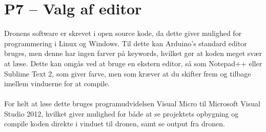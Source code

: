 \documentclass[Main]{subfiles}
\begin{document}
\section[Valg af editor]{P7 -- Valg af editor}\label{sec:software}
Dronens software er skrevet i open source kode, da dette giver mulighed for programmering i Linux og Windows\cite{AQ-software}.
Til dette kan Arduino's standard editor bruges, men denne har ingen farver på keywords, hvilket gør at koden meget svær at læse.
Dette kan omgås ved at bruge en ekstern editor, så som Notepad++\cite{NotePadPP} eller Sublime Text 2\cite{Sublime2}, som giver farve, men som kræver at du skifter frem og tilbage imellem vinduerne for at compile.
\\
\\
For helt at løse dette bruges programudvidelsen Visual Micro\cite{VM} til Microsoft Visual Studio 2012, hvilket giver mulighed for både at se projektets opbygning og compile koden direkte i vinduet til dronen, samt se output fra dronen.



%
%


%
%
\end{document}
